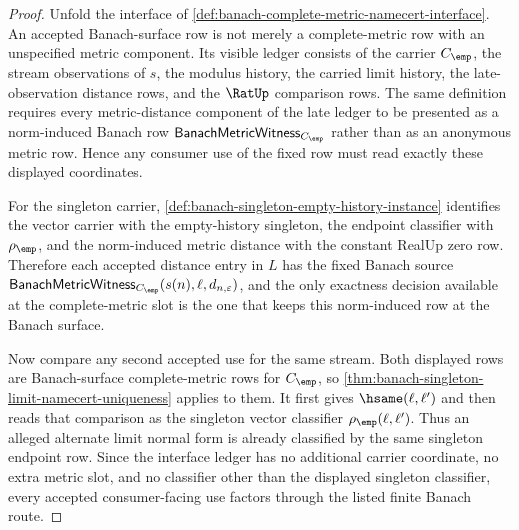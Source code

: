 \begin{proof}
Unfold the interface of
\autoref{def:banach-complete-metric-namecert-interface}. An accepted
Banach-surface row is not merely a complete-metric row with an unspecified
metric component. Its visible ledger consists of the carrier $C_{\emp}$, the
stream observations of $s$, the modulus history, the carried limit history,
the late-observation distance rows, and the $\RatUp$ comparison rows. The same
definition requires every metric-distance component of the late ledger to be
presented as a norm-induced Banach row
$\mathsf{BanachMetricWitness}_{C_{\emp}}$ rather than as an anonymous metric
row. Hence any consumer use of the fixed row must read exactly these displayed
coordinates.

For the singleton carrier, \autoref{def:banach-singleton-empty-history-instance}
identifies the vector carrier with the empty-history singleton, the endpoint
classifier with $\rho_{\emp}$, and the norm-induced metric distance with the
constant RealUp zero row. Therefore each accepted distance entry in $L$ has the
fixed Banach source
$\mathsf{BanachMetricWitness}_{C_{\emp}}(s(n),\ell,d_{n,\varepsilon})$, and the
only exactness decision available at the complete-metric slot is the one that
keeps this norm-induced row at the Banach surface.

Now compare any second accepted use for the same stream. Both displayed rows
are Banach-surface complete-metric rows for $C_{\emp}$, so
\autoref{thm:banach-singleton-limit-namecert-uniqueness} applies to them. It
first gives $\hsame(\ell,\ell')$ and then reads that comparison as the
singleton vector classifier $\rho_{\emp}(\ell,\ell')$. Thus an alleged alternate
limit normal form is already classified by the same singleton endpoint row.
Since the interface ledger has no additional carrier coordinate, no extra
metric slot, and no classifier other than the displayed singleton classifier,
every accepted consumer-facing use factors through the listed finite Banach
route.
\end{proof}
